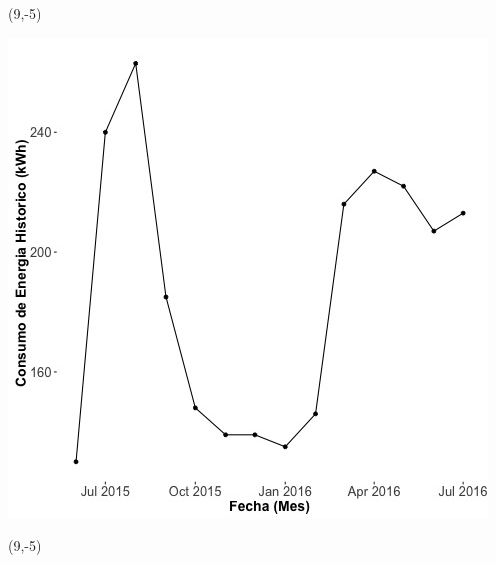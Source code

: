 \documentclass{article}\usepackage[]{graphicx}\usepackage[]{color}
\newenvironment{knitrout}{}{} %
\begin{document}
 \begin{textblock}{1}(9,-5)
\begin{minipage}{20em}
\begingroup

\endgroup
\end{minipage}
\end{textblock}

\begin{knitrout}
\color{fgcolor}
\includegraphics[scale=0.65]{figure/A19_historico_energia} 
\end{knitrout}

 \begin{textblock}{1}(9,-5)
\begin{minipage}{20em}
\begingroup

\endgroup
\end{minipage}
\end{textblock}
\end{document}
